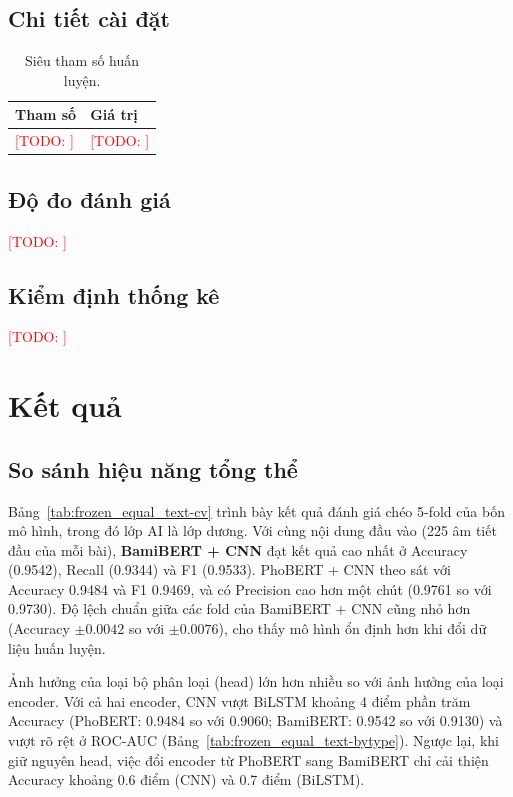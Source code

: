 \documentclass[11pt,a4paper]{article}
\newcommand{\todo}[1]{\textcolor{red}{[TODO: #1]}}
\begin{document}
\subsection{Chi tiết cài đặt}
\begin{table}[t]
  \centering
  \caption{Siêu tham số huấn luyện.}
  \label{tab:hparams}
  \begin{tabular}{ll}
    \toprule
    Tham số & Giá trị \\
    \midrule
    \todo{} & \todo{} \\
    \bottomrule
  \end{tabular}
\end{table}

\subsection{Độ đo đánh giá}
\todo{}

\subsection{Kiểm định thống kê}
\todo{}

\section{Kết quả}
\label{sec:results}

\subsection{So sánh hiệu năng tổng thể}
Bảng~\ref{tab:frozen_equal_text-cv} trình bày kết quả đánh giá chéo 5-fold của bốn mô hình, trong đó lớp AI là lớp dương. Với cùng nội dung đầu vào (225 âm tiết đầu của mỗi bài), \textbf{BamiBERT + CNN} đạt kết quả cao nhất ở Accuracy (0.9542), Recall (0.9344) và F1 (0.9533). PhoBERT + CNN theo sát với Accuracy 0.9484 và F1 0.9469, và có Precision cao hơn một chút (0.9761 so với 0.9730). Độ lệch chuẩn giữa các fold của BamiBERT + CNN cũng nhỏ hơn (Accuracy $\pm 0.0042$ so với $\pm 0.0076$), cho thấy mô hình ổn định hơn khi đổi dữ liệu huấn luyện.

\IfFileExists{main_table.tex}{}{\todo{chèn main\_table.tex}}

Ảnh hưởng của loại bộ phân loại (head) lớn hơn nhiều so với ảnh hưởng của loại encoder. Với cả hai encoder, CNN vượt BiLSTM khoảng 4 điểm phần trăm Accuracy (PhoBERT: 0.9484 so với 0.9060; BamiBERT: 0.9542 so với 0.9130) và vượt rõ rệt ở ROC-AUC (Bảng~\ref{tab:frozen_equal_text-bytype}). Ngược lại, khi giữ nguyên head, việc đổi encoder từ PhoBERT sang BamiBERT chỉ cải thiện Accuracy khoảng 0.6 điểm (CNN) và 0.7 điểm (BiLSTM).
\end{document}
